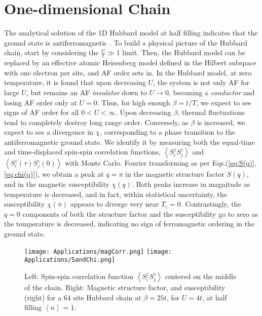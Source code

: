 \section{One-dimensional Chain}
\label{sec:1d-chain}

The analytical solution of the \acs{1D} Hubbard model at half filling indicates that the ground state is antiferromagnetic \cite{lieb_absence_1968}.
To build a physical picture of the Hubbard chain, start by considering the $\frac{U}{t} \gg 1$ limit. 
Then, the Hubbard model can be replaced by an effective atomic Heisenberg model defined in the Hilbert subspace with one electron per site, and \ac{AF} order sets in.
In the Hubbard model, at zero temperature, it is found that upon decreasing $U$, the system is not only \acs{AF} for large $U$, but remains an \acs{AF} \emph{insulator} down to $U \rightarrow 0$, becoming a \emph{conductor} and losing \acs{AF} order only at $U = 0$.
Thus, for high enough $\beta = t / T$, we expect to see signs of \acs{AF} order for all $0 < U < \infty$.
Upon decreasing $\beta$, thermal fluctuations tend to completely destroy long range order.
Conversely, as $\beta$ is increased, we expect to see a divergence in $\chi$, corresponding to a phase transition to the antiferromagnetic ground state.
We identify it by measuring both the equal-time and time-displaced spin-spin correlation functions, $\left\langle S^z_i  S^z_j \right\rangle$ and $\left\langle S^z_i (\tau) S^z_j (0) \right\rangle$ with Monte Carlo.
Fourier transforming as per Eqs.(\ref{eq:S(q)},\ref{eq:chi(q)}), we obtain a peak at $q = \pi$ in the magnetic structure factor $S ( q ) $, and in the magnetic susceptibility $\chi (q)$.
Both peaks increase in magnitude as temperature is decreased, and in fact, within statistical uncertainty, the  susceptibility $\chi (\pi)$ appears to diverge very near $T_c = 0$.
Contrastingly, the $q = 0$ components of both the structure factor and the susceptibility go to zero as the temperature is decreased, indicating  no sign of ferromagnetic ordering in the ground state.
\begin{figure}[H]\label{fig:corr_FT}
\hspace{0.2cm}
\texttt{[image: Applications/magCorr.png]}
\hspace{0.7cm}
\texttt{[image: Applications/SandChi.png]}
\caption[Spin-spin correlation function, magnetic structure factor, and susceptibility for a 64 site Hubbard chain at $\beta = 25 t$, for $U = 4t$.]{Left: Spin-spin correlation function $\left\langle S^z_i S^z_j \right\rangle$ centered on the middle of the chain.
Right: Magnetic structure factor, and susceptibility (right) for a 64 site Hubbard chain at $\beta = 25 t$, for $U = 4t$, at half filling $\left\langle n \right\rangle = 1$.}
\end{figure}

